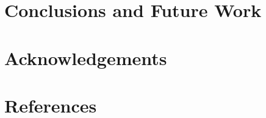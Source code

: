\documentclass[review]{elsarticle}
\begin{document}
\clearpage

\section{Conclusions and Future Work}

\section{Acknowledgements}

\clearpage

\section*{References}


\end{document}
